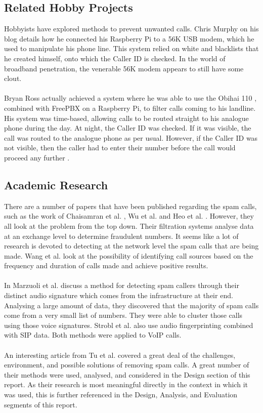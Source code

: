 \documentclass[main.tex]{subfiles}
\begin{document}
\subsection{Related Hobby Projects}
Hobbyists have explored methods to prevent unwanted calls. Chris Murphy on his blog \cite{murphy} details how he connected his Raspberry Pi to a 56K USB modem, which he used to manipulate his phone line. This system relied on white and blacklists that he created himself, onto which the Caller ID is checked. In the world of broadband penetration, the venerable 56K modem appears to still have some clout.
\\\\
Bryan Ross actually achieved a system where he was able to use the Obihai 110 \cite{obi110-specs}, combined with FreePBX on a Raspberry Pi, to filter calls coming to his landline. His system was time-based, allowing calls to be routed straight to his analogue phone during the day. At night, the Caller ID was checked. If it was visible, the call was routed to the analogue phone as per usual. However, if the Caller ID was not visible, then the caller had to enter their number before the call would proceed any further \cite{bryanross}.

\subsection{Academic Research}
There are a number of papers that have been published regarding the spam calls, such as the work of Chaisamran et al. \cite{chaisa}, Wu et al. \cite{wu} and Heo et al. \cite{heo}. However, they all look at the problem from the top down. Their filtration systems analyse data at an exchange level to determine fraudulent numbers. It seems like a lot of research is devoted to detecting at the network level the spam calls that are being made. Wang et al. \cite{wang} look at the possibility of identifying call sources based on the frequency and duration of calls made and achieve positive results.
\\\\
In Marzuoli et al. \cite{marzuoli} discuss a method for detecting spam callers through their distinct audio signature which comes from the infrastructure at their end. Analysing a large amount of data, they discovered that the majority of spam calls come from a very small list of numbers. They were able to cluster those calls using those voice signatures. Strobl et al. \cite{strobl} also use audio fingerprinting combined with SIP data. Both methods were applied to VoIP calls.
\\\\
An interesting article from Tu et al. \cite{cisco} covered a great deal of the challenges, environment, and possible solutions of removing spam calls. A great number of their methods were used, analysed, and considered in the Design section of this report. As their research is most meaningful directly in the context in which it was used, this is further referenced in the Design, Analysis, and Evaluation segments of this report.
\end{document}
